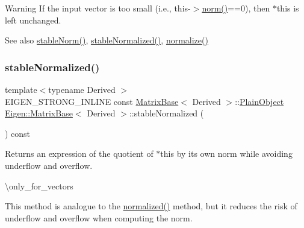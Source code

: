 \begin{DoxyWarning}{Warning}
If the input vector is too small (i.\+e., this-\/$>$\mbox{\hyperlink{class_eigen_1_1_matrix_base_a5f6a3bc46add1f2e879ce15040e6987e}{norm()}}==0), then {\ttfamily $\ast$this} is left unchanged.
\end{DoxyWarning}
\begin{DoxySeeAlso}{See also}
\mbox{\hyperlink{class_eigen_1_1_matrix_base_ab84d3e64f855813b1eea4202c0697dc1}{stable\+Norm()}}, \mbox{\hyperlink{class_eigen_1_1_matrix_base_a218ec9c7827f714c965df0865b420728}{stable\+Normalized()}}, \mbox{\hyperlink{class_eigen_1_1_matrix_base_a1a2dd2fd1597ee6d51098aa3bb7c86f4}{normalize()}} 
\end{DoxySeeAlso}
\mbox{\label{class_eigen_1_1_matrix_base_a218ec9c7827f714c965df0865b420728}} 
\subsubsection{\texorpdfstring{stableNormalized()}{stableNormalized()}}
{\footnotesize\ttfamily template$<$typename Derived $>$ \\
E\+I\+G\+E\+N\+\_\+\+S\+T\+R\+O\+N\+G\+\_\+\+I\+N\+L\+I\+NE const \mbox{\hyperlink{class_eigen_1_1_matrix_base}{Matrix\+Base}}$<$ Derived $>$\+::\mbox{\hyperlink{class_eigen_1_1_dense_base_aae45af9b5aca5a9caae98fd201f47cc4}{Plain\+Object}} \mbox{\hyperlink{class_eigen_1_1_matrix_base}{Eigen\+::\+Matrix\+Base}}$<$ Derived $>$\+::stable\+Normalized (\begin{DoxyParamCaption}{ }\end{DoxyParamCaption}) const}

\begin{DoxyReturn}{Returns}
an expression of the quotient of {\ttfamily $\ast$this} by its own norm while avoiding underflow and overflow.
\end{DoxyReturn}
\textbackslash{}only\+\_\+for\+\_\+vectors

This method is analogue to the \mbox{\hyperlink{class_eigen_1_1_matrix_base_a6ede5c8ebe9631fed9004fedbf9e4016}{normalized()}} method, but it reduces the risk of underflow and overflow when computing the norm.


